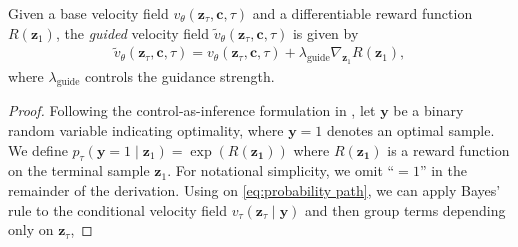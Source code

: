 \documentclass[letterpaper,10 pt,conference]{ieeeconf}
\begin{document}
\begin{proposition}
Given a base velocity field $v_\theta(\mathbf{z}_\tau,\mathbf{c},\tau)$ and a differentiable reward function $R(\mathbf{z}_1)$, the \textit{guided} velocity field $\tilde{v}_\theta(\mathbf{z}_\tau,\mathbf{c},\tau)$ is given by
\begin{align}\label{eq:CFM guidance}
    \tilde{v}_\theta(\mathbf{z}_\tau,\mathbf{c},\tau) = v_\theta(\mathbf{z}_\tau,\mathbf{c},\tau) + \lambda_\text{guide}\nabla_{\mathbf{z}_1} R(\mathbf{z}_1),
\end{align}
where $\lambda_\text{guide}$ controls the guidance strength.
\end{proposition}
\begin{proof}
Following the control-as-inference formulation in \cite{JannerDuEtAl2022,Levine2018}, let $\mathbf{y}$ be a binary random variable indicating optimality, where $\mathbf{y}=1$ denotes an optimal sample. 
We define $p_\tau(\mathbf{y}=1 \mid \mathbf{z}_1) = \exp \left(R(\mathbf{z_1})\right)$ where $R(\mathbf{z_1})$ is a reward function on the terminal sample $\mathbf{z}_1$.
For notational simplicity, we omit ``$=1$'' in the remainder of the derivation.
Using \cite[Lem.~1]{ZhengLeEtAl2023} on \eqref{eq:probability path}, we can apply Bayes' rule to the conditional velocity field $v_\tau(\mathbf{z}_\tau\mid\mathbf{y})$ and then group terms depending only on $\mathbf{z}_\tau$,


\end{proof}
\end{document}
